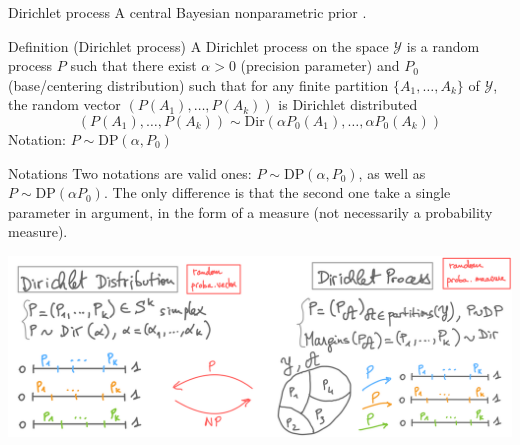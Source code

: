 \begin{frame}{Dirichlet process}
A central Bayesian nonparametric prior \citep{ferguson1973bayesian}.\pause

\begin{block}{Definition (Dirichlet process)}
A \alert{Dirichlet process} on the space $\mathcal{Y}$ is a random process $ P $ such that there exist $ \alpha>0 $ (precision parameter) and $ P_0 $ (base/centering distribution) \pause such that for any finite partition $ \{A_1,\ldots,A_k\} $ of $\mathcal{Y}$, the random vector
$ (P(A_1),\ldots,P(A_k)) $ is Dirichlet distributed
\[ (P(A_1),\ldots,P(A_k))\sim \text{Dir}(\alpha P_0(A_1),\ldots,\alpha P_0(A_k)) \]
\alert{Notation}: $ P \sim \text{DP}(\alpha, P_0) $
\end{block}
\begin{center}
\end{center}
\end{frame}

\begin{frame}{Notations}
	Two \alert{notations} are valid ones: $ P \sim \text{DP}(\alpha, P_0) $, as well as $ P \sim \text{DP}(\alpha P_0) $. The only difference is that the second one take a single parameter in argument, in the form of a measure (not necessarily a probability measure). \pause
	
	\pause 
	
	
	\begin{center}
\includegraphics[width=\textwidth]{figures_julyan/introRPM/DP-drawing}
\end{center}

\end{frame}

